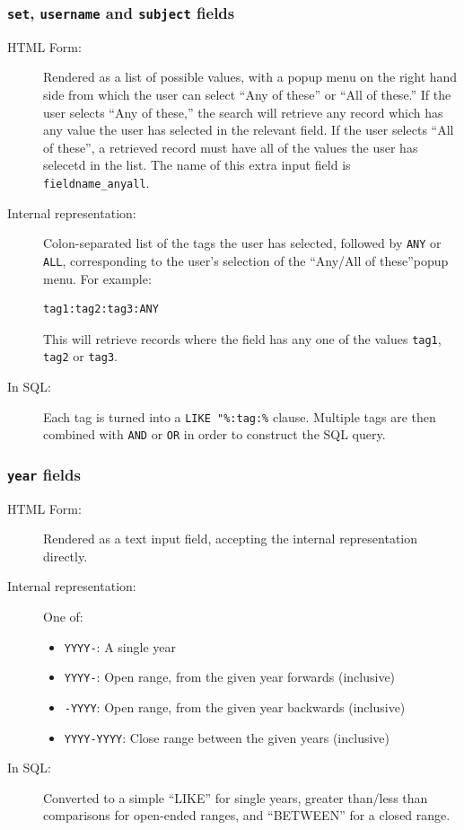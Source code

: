 \subsubsection{{\tt set}, {\tt username} and {\tt subject} fields}

\begin{description}
\item[HTML Form:] Rendered as a list of possible values, with a popup menu on the right hand side from which the user can select ``Any of these'' or ``All of these.'' If the user selects ``Any of these,'' the search will retrieve any record which has any value the user has selected in the relevant field. If the user selects ``All of these'', a retrieved record must have all of the values the user has selecetd in the list.  The name of this extra input field is {\tt fieldname\_anyall}.

\item[Internal representation:] Colon-separated list of the tags the user has selected, followed by {\tt ANY} or {\tt ALL}, corresponding to the user's selection of the ``Any/All of these''popup menu. For example:

\begin{verbatim}
tag1:tag2:tag3:ANY
\end{verbatim}

This will retrieve records where the field has any one of the values {\tt tag1}, {\tt tag2} or {\tt tag3}.

\item[In SQL:] Each tag is turned into a {\tt LIKE "\%:tag:\%} clause. Multiple tags are then combined with {\tt AND} or {\tt OR}  in order to construct the SQL query.
\end{description}


\subsubsection{{\tt year} fields}

\begin{description}
\item[HTML Form:] Rendered as a text input field, accepting the internal representation directly.

\item[Internal representation:] One of:
\begin{itemize}
\item {\tt YYYY-}: A single year
\item {\tt YYYY-}: Open range, from the given year forwards (inclusive)
\item {\tt -YYYY}: Open range, from the given year backwards (inclusive)
\item {\tt YYYY-YYYY}: Close range between the given years (inclusive)
\end{itemize}

\item[In SQL:] Converted to a simple ``LIKE'' for single years, greater than/less than comparisons for open-ended ranges, and ``BETWEEN'' for a closed range.
\end{description}


